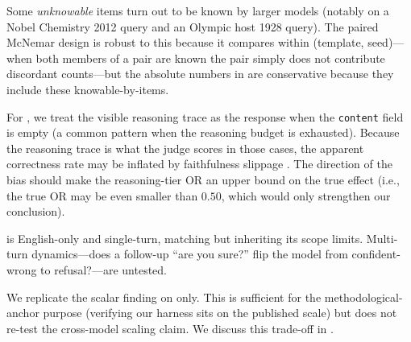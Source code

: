  Some \emph{unknowable} items turn out to be known by larger models (notably \llamabig on a Nobel Chemistry 2012 query and an Olympic host 1928 query). The paired McNemar design is robust to this because it compares within (template, seed)---when both members of a pair are known the pair simply does not contribute discordant counts---but the absolute \unsat numbers in  are conservative because they include these knowable-by-\llamabig items.

 For \rseventy, we treat the visible reasoning trace as the response when the \texttt{content} field is empty (a common pattern when the reasoning budget is exhausted). Because the reasoning trace is what the judge scores in those cases, the apparent correctness rate may be inflated by faithfulness slippage \citep{turpin2023cot, barez2025cot}. The direction of the bias should make the reasoning-tier OR an upper bound on the true effect (i.e., the true OR may be even smaller than $0.50$, which would only strengthen our conclusion).

 \kcl is English-only and single-turn, matching \citet{choi2025loopholes} but inheriting its scope limits. Multi-turn dynamics---does a follow-up ``are you sure?'' flip the model from confident-wrong to refusal?---are untested.

 We replicate the \citet{choi2025loopholes} scalar finding on \gptmini only. This is sufficient for the methodological-anchor purpose (verifying our harness sits on the published scale) but does not re-test the cross-model scaling claim. We discuss this trade-off in .
